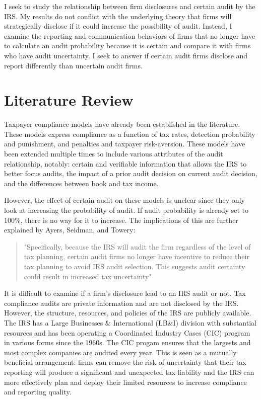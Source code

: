 \documentclass[12pt]{article}
\begin{document}
\vspace{\baselineskip}

I seek to study the relationship between firm disclosures and certain audit by the IRS. My results do not conflict with the underlying theory that firms will strategically disclose if it could increase the possibility of audit. Instead, I examine the reporting and communication behaviors of firms that no longer have to calculate an audit probability because it is certain and compare it with firms who have audit uncertainty. I seek to answer if certain audit firms disclose and report differently than uncertain audit firms.

\section{Literature Review}
Taxpayer compliance models have already been established in the literature. These models express compliance as a function of tax rates, detection probability and punishment, and penalties and taxpayer risk-aversion. \citep{Allingham1972} These models have been extended multiple times to include various attributes of the audit relationship, notably: certain and verifiable information that allows the IRS to better focus audits\citep{Sansing1993}, the impact of a prior audit decision on current audit decision\citep{Rhoades1999}, and the differences between book and tax income\citep{Mills2000}.

\vspace{\baselineskip}

However, the effect of certain audit on these models is unclear since they only look at increasing the probability of audit. If audit probability is already set to 100\%, there is no way for it to increase. The implications of this are further explained by Ayers, Seidman, and Towery:
\begin{quote}
"Specifically, because the IRS will audit the firm regardless of the level of tax planning, certain audit firms no longer have incentive to reduce their tax planning to avoid IRS audit selection. This suggests audit certainty could result in increased tax uncertainty" \citep{Ayers2019}
\end{quote}

It is difficult to examine if a firm's disclosure lead to an IRS audit or not. Tax compliance audits are private information and are not disclosed by the IRS. However, the structure, resources, and policies of the IRS are publicly available. The IRS has a Large Businesses \& International (LB\&I) division with substantial resources and has been operating a Coordinated Industry Cases (CIC) program in various forms since the 1960s. The CIC progam ensures that the largests and most complex companies are audited every year. This is seen as a mutually beneficial arrangement: firms can remove the risk of uncertainty that their tax reporting will produce a significant and unexpected tax liability and the IRS can more effectively plan and deploy their limited resources to increase compliance and reporting quality.
\end{document}
